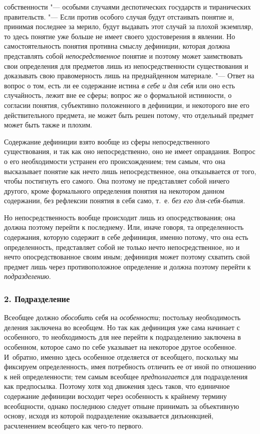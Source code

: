 {{собственности "--- особыми случаями деспотических государств и
тиранических правительств. "--- Если против особого случая
будут отстаивать понятие и, принимая последнее за мерило, будут выдавать
этот случай за плохой экземпляр, то здесь понятие уже больше не имеет
своего удостоверения в явлении. Но самостоятельность понятия противна
смыслу дефиниции, которая должна представлять собой
{\em непосредственное}
понятие и поэтому может заимствовать свои определения для
предметов лишь из непосредственности существования и доказывать свою
правомерность лишь на преднайденном материале. "--- Ответ на
вопрос о том, есть ли ее содержание истина
{\em в себе и для себя}
или оно есть случайность, лежит вне ее сферы; вопрос же о
формальной истинности, о согласии понятия, субъективно положенного в
дефиниции, и некоторого вне его действительного предмета, не может быть
решен потому, что отдельный предмет может быть также и плохим.

Содержание дефиниции взято вообще из сферы непосредственного
существования, и так как оно непосредственно, оно не имеет оправдания.
Вопрос о его необходимости устранен его происхождением; тем самым, что она
высказывает понятие как нечто лишь непосредственное, она отказывается от
того, чтобы постигнуть его самого. Она поэтому не представляет собой ничего
другого, кроме формального определения понятия на некотором данном
содержании, без рефлексии понятия в себя само, т.~е.
{\em без его для-себя-бытия}.

Но непосредственность вообще происходит лишь из
опосредствования; она должна поэтому перейти к последнему. Или,
иначе говоря, та определенность содержания, которую содержит
в себе дефиниция, именно потому, что она есть определенность, представляет
собой не только нечто непосредственное, но и нечто опосредствованное своим
иным; дефиниция может поэтому схватить свой предмет лишь через
противоположное определение и должна поэтому перейти к
{\em подразделению}.


\subsubsection[2. Подразделение]{\bfseries 2. Подразделение}

Всеобщее должно
{\em обособить} себя на
{\em особенности};
постольку необходимость деления заключена во всеобщем. Но так
как дефиниция уже сама начинает с особенного, то необходимость для нее
перейти к подразделению заключена в особенном, которое само по себе
указывает на некоторое другое особенное. И~обратно, именно здесь особенное
отделяется от всеобщего, поскольку мы фиксируем определенность, имея
потребность отличить ее от иной по отношению к ней определенности; тем
самым всеобщее {\em предполагается}
для подразделения как предпосылка. Поэтому хотя ход движения
здесь таков, что единичное содержание дефиниции восходит через особенность
к крайнему термину всеобщности, однако последнюю следует отныне принимать
за объективную основу, исходя из которой подразделение оказывается
дизъюнкцией, расчленением всеобщего как чего-то первого.

}}
